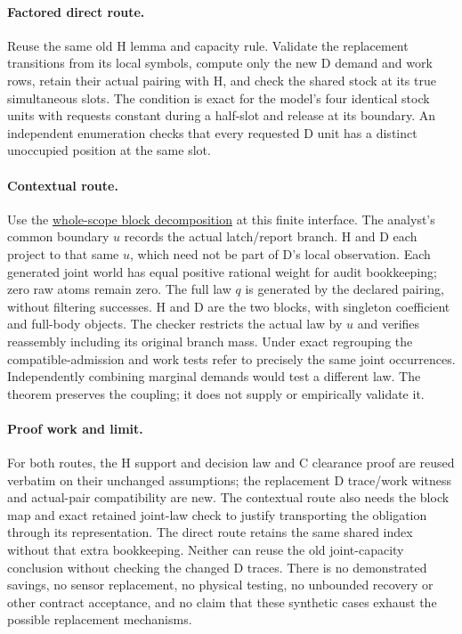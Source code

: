 \documentclass[11pt]{article}
\begin{document}
\paragraph{Factored direct route.}
Reuse the same old H lemma and capacity rule. Validate the replacement transitions from its local symbols, compute only the new D demand and work rows, retain their actual pairing with H, and check the shared stock at its true simultaneous slots. The condition is exact for the model's four identical stock units with requests constant during a half-slot and release at its boundary. An independent enumeration checks that every requested D unit has a distinct unoccupied position at the same slot.

\paragraph{Contextual route.}
Use the \href{https://github.com/eternal-november/eos-research-programmes/blob/e1348964f73704212d2d8b48d5982a5ed600a2ff/projects/contextual-composition/foundations/shared-world-native-assembly/Whole_Scope_Block_Decomposition.tex\#L47-L60}{whole-scope block decomposition} at this finite interface. The analyst's common boundary \(u\) records the actual latch/report branch. H and D each project to that same \(u\), which need not be part of D's local observation. Each generated joint world has equal positive rational weight for audit bookkeeping; zero raw atoms remain zero. The full law \(q\) is generated by the declared pairing, without filtering successes. H and D are the two blocks, with singleton coefficient and full-body objects. The checker restricts the actual law by \(u\) and verifies reassembly including its original branch mass. Under exact regrouping the compatible-admission and work tests refer to precisely the same joint occurrences. Independently combining marginal demands would test a different law. The theorem preserves the coupling; it does not supply or empirically validate it.

\paragraph{Proof work and limit.}
For both routes, the H support and decision law and C clearance proof are reused verbatim on their unchanged assumptions; the replacement D trace/work witness and actual-pair compatibility are new. The contextual route also needs the block map and exact retained joint-law check to justify transporting the obligation through its representation. The direct route retains the same shared index without that extra bookkeeping. Neither can reuse the old joint-capacity conclusion without checking the changed D traces. There is no demonstrated savings, no sensor replacement, no physical testing, no unbounded recovery or other contract acceptance, and no claim that these synthetic cases exhaust the possible replacement mechanisms.
\end{document}
